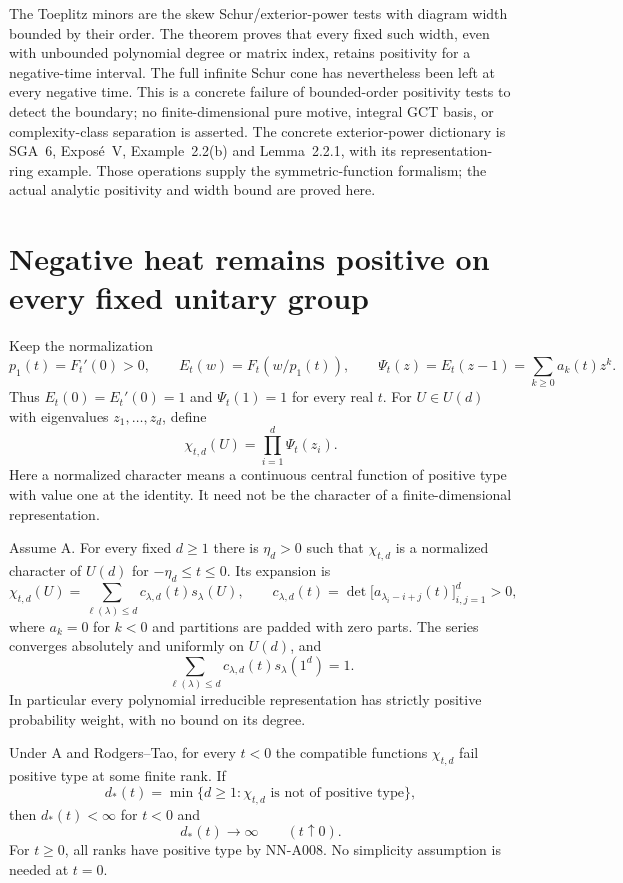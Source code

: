 The Toeplitz minors are the skew Schur/exterior-power tests with
diagram width bounded by their order. The theorem proves that
every fixed such width, even with unbounded polynomial degree or
matrix index, retains positivity for a negative-time interval.
The full infinite Schur cone has nevertheless been left at every
negative time. This is a concrete failure of bounded-order
positivity tests to detect the boundary; no finite-dimensional
pure motive, integral GCT basis, or complexity-class separation
is asserted.
The concrete exterior-power dictionary is SGA~6, Expos\'e~V,
Example~2.2(b) and Lemma~2.2.1, with its representation-ring
example. Those operations supply the symmetric-function
formalism; the actual analytic positivity and width bound
are proved here.


\section{Negative heat remains positive on every fixed unitary group}
\label{sec:analytic-finite-rank-characters}

Keep the normalization
\[
 p_1(t)=F_t'(0)>0,\qquad
 E_t(w)=F_t(w/p_1(t)),\qquad
 \Psi_t(z)=E_t(z-1)=\sum_{k\ge0}a_k(t)z^k.
\]
Thus $E_t(0)=E_t'(0)=1$ and $\Psi_t(1)=1$ for every real $t$.
For $U\in U(d)$ with eigenvalues $z_1,\ldots,z_d$, define
\[
             \chi_{t,d}(U)=\prod_{i=1}^d\Psi_t(z_i).
\]
Here a normalized character means a continuous central function of
positive type with value one at the identity. It need not be the
character of a finite-dimensional representation.

\begin{theorem}
Assume A. For every fixed $d\ge1$ there is $\eta_d>0$ such that
$\chi_{t,d}$ is a normalized character of $U(d)$ for
$-\eta_d\le t\le0$. Its expansion is
\begin{equation}\label{eq:analytic-fixed-unitary-expansion}
 \chi_{t,d}(U)=
 \sum_{\ell(\lambda)\le d}c_{\lambda,d}(t)s_\lambda(U),
 \qquad
 c_{\lambda,d}(t)=
       \det\bigl[a_{\lambda_i-i+j}(t)\bigr]_{i,j=1}^d>0,
\end{equation}
where $a_k=0$ for $k<0$ and partitions are padded with zero parts.
The series converges absolutely and uniformly on $U(d)$, and
\[
       \sum_{\ell(\lambda)\le d}
          c_{\lambda,d}(t)s_\lambda(1^d)=1.
\]
In particular every polynomial irreducible representation has
strictly positive probability weight, with no bound on its degree.

Under A and Rodgers--Tao, for every $t<0$ the compatible functions
$\chi_{t,d}$ fail positive type at some finite rank. If
\[
 d_*(t)=\min\{d\ge1:\chi_{t,d}\text{ is not of positive type}\},
\]
then $d_*(t)<\infty$ for $t<0$ and
\[
                         d_*(t)\longrightarrow\infty
                                  \qquad(t\uparrow0).
\]
For $t\ge0$, all ranks have positive type by NN-A008. No
simplicity assumption is needed at $t=0$.
\end{theorem}


